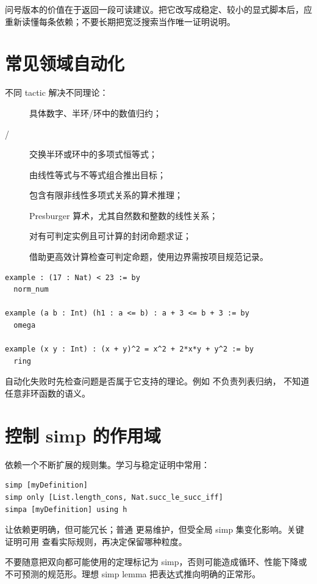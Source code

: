 问号版本的价值在于返回一段可读建议。把它改写成稳定、较小的显式脚本后，应重新读懂每条依赖；不要长期把宽泛搜索当作唯一证明说明。

\section{常见领域自动化}

不同 tactic 解决不同理论：
\begin{description}
  \item[] 具体数字、半环/环中的数值归约；
  \item[ / ] 交换半环或环中的多项式恒等式；
  \item[] 由线性等式与不等式组合推出目标；
  \item[] 包含有限非线性多项式关系的算术推理；
  \item[] Presburger 算术，尤其自然数和整数的线性关系；
  \item[] 对有可判定实例且可计算的封闭命题求证；
  \item[] 借助更高效计算检查可判定命题，使用边界需按项目规范记录。
\end{description}

\begin{lstlisting}
example : (17 : Nat) < 23 := by
  norm_num

example (a b : Int) (h1 : a <= b) : a + 3 <= b + 3 := by
  omega

example (x y : Int) : (x + y)^2 = x^2 + 2*x*y + y^2 := by
  ring
\end{lstlisting}
自动化失败时先检查问题是否属于它支持的理论。例如  不负责列表归纳， 不知道任意非环函数的语义。

\section{控制 simp 的作用域}

 依赖一个不断扩展的规则集。学习与稳定证明中常用：
\begin{lstlisting}
simp [myDefinition]
simp only [List.length_cons, Nat.succ_le_succ_iff]
simpa [myDefinition] using h
\end{lstlisting}
 让依赖更明确，但可能冗长；普通  更易维护，但受全局 simp 集变化影响。关键证明可用  查看实际规则，再决定保留哪种粒度。

不要随意把双向都可能使用的定理标记为 simp，否则可能造成循环、性能下降或不可预测的规范形。理想 simp lemma 把表达式推向明确的正常形。

